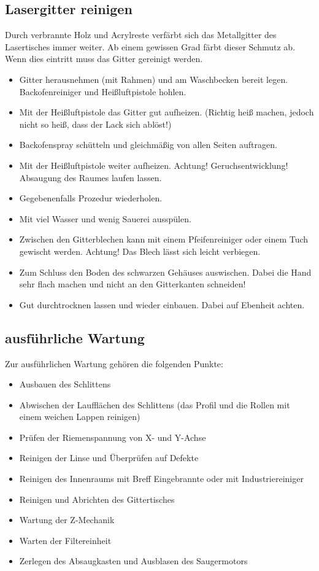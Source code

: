 \documentclass{\basedir/fablab-document}
\begin{document}
\subsection{Lasergitter reinigen}
Durch verbrannte Holz und Acrylreste verfärbt sich das Metallgitter des Lasertisches immer weiter. Ab einem gewissen Grad färbt dieser Schmutz ab. Wenn dies eintritt muss das Gitter gereinigt werden.
\begin{itemize}
	\item Gitter herausnehmen (mit Rahmen) und am Waschbecken bereit legen. Backofenreiniger und Heißluftpistole hohlen.
	\item Mit der Heißluftpistole das Gitter gut aufheizen. (Richtig heiß machen, jedoch nicht so heiß, dass der Lack sich ablöst!)
	\item Backofenspray schütteln und gleichmäßig von allen Seiten auftragen.
	\item Mit der Heißluftpistole weiter aufheizen. Achtung! Geruchsentwicklung! Absaugung des Raumes laufen lassen.
	\item Gegebenenfalls Prozedur wiederholen.
	\item Mit viel Wasser und wenig Sauerei ausspülen.
	\item Zwischen den Gitterblechen kann mit einem Pfeifenreiniger oder einem Tuch gewischt werden. Achtung! Das Blech lässt sich leicht verbiegen.
	\item Zum Schluss den Boden des schwarzen Gehäuses auswischen. Dabei die Hand sehr flach machen und nicht an den Gitterkanten schneiden!
	\item Gut durchtrocknen lassen und wieder einbauen. Dabei auf Ebenheit achten.
\end{itemize}
\subsection{ausführliche Wartung}
Zur ausführlichen Wartung gehören die folgenden Punkte:
\begin{itemize}
\item Ausbauen des Schlittens
\item Abwischen der Laufflächen des Schlittens (das Profil und die Rollen mit einem weichen Lappen reinigen)
\item Prüfen der Riemenspannung von X- und Y-Achse
\item Reinigen der Linse und Überprüfen auf Defekte
\item Reinigen des Innenraums mit Breff Eingebrannte oder mit Industriereiniger
\item Reinigen und Abrichten des Gittertisches
\item Wartung der Z-Mechanik
\item Warten der Filtereinheit
\item Zerlegen des Absaugkasten und Ausblasen des Saugermotors
\end{itemize}
\end{document}
